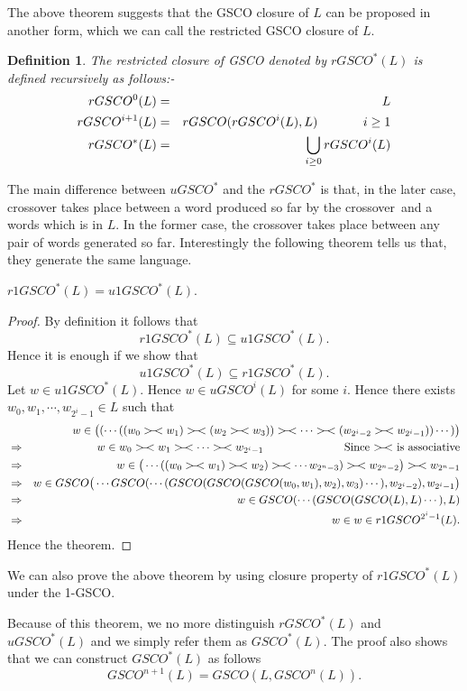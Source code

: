 \documentclass{llncs}
\newtheorem{defin}{Definition}
\newcommand{\sa}{crossover~}
\newcommand{\ers}{>\hspace{-2mm}-\hspace{-2mm}<}
\begin{document}
\par The above theorem suggests that the GSCO closure of $L$ can be proposed in another form, which we can call the restricted GSCO closure of $L$.
\begin{defin}
The restricted closure of GSCO denoted by $rGSCO^*(L)$ is defined
recursively as follows:-
\begin{eqnarray*}
rGSCO^0(L)&=&L\\
rGSCO^{i+1}(L)&=&rGSCO(rGSCO^i(L),L)\hspace{0.5in}i\geq1\\
rGSCO^*(L)&=&\bigcup_{i\geq0}rGSCO^i(L)
\end{eqnarray*}
\end{defin}
\par The main difference between $uGSCO^*$ and the $rGSCO^*$ is that, in the later case, crossover takes place between a word produced so far by the \sa and a words which is in $L$. In the former case, the crossover takes place between any pair of words generated so far. Interestingly the following theorem tells us that, they generate the same language.
\begin{theorem}
$r1GSCO^*(L)=u1GSCO^*(L)$.
\end{theorem}
\begin{proof}
By  definition it follows that
\[r1GSCO^*(L)\subseteq u1GSCO^*(L).\]
Hence it is enough if we show that
\[u1GSCO^*(L)\subseteq r1GSCO^*(L).\]
Let $w\in u1GSCO^*(L)$. Hence $w\in uGSCO^i(L)$ for some $i$. Hence
there exists $w_0,w_1,\cdots,w_{2^i-1}\in L$ such that
\begin{eqnarray*}
&&w\in\big((\cdots((w_0\ers w_1)\ers(w_2\ers w_3))\ers\cdots\ers(w_{2^i-2}\ers w_{2^i-1}))\cdots)\big)\\
&\Rightarrow&w\in w_0\ers w_1\ers\cdots\ers w_{2^i-1}\hspace{1in}\mbox{Since $\ers$ is associative}\\
&\Rightarrow&w\in \big(\cdots((w_0\ers w_1)\ers w_2)\ers\cdots w_{2^n-3})\ers w_{2^n-2}\big)\ers w_{2^n-1}\\
&\Rightarrow&w\in GSCO\big(\cdots GSCO(\cdots( GSCO(GSCO(GSCO(w_0,w_1),w_2),w_3)\cdots),w_{2^i-2}),w_{2^i-1}\big)\\
&\Rightarrow&w\in GSCO(\cdots(GSCO(GSCO(L),L)\cdots),L)\\
&\Rightarrow&w\in w\in r1GSCO^{2^i-1}(L).
\end{eqnarray*}
Hence the theorem.
\end{proof}
\begin{note}
We can also prove the above theorem by using closure property of
$r1GSCO^*(L)$ under the 1-GSCO.
\end{note}
\par Because of this theorem, we no more distinguish $rGSCO^*(L)$ and $uGSCO^*(L)$ and we simply refer them as $GSCO^*(L)$. The proof also shows that we can construct $GSCO^*(L)$ as follows
\[GSCO^{n+1}(L)=GSCO(L,GSCO^n(L)).\]
\end{document}
